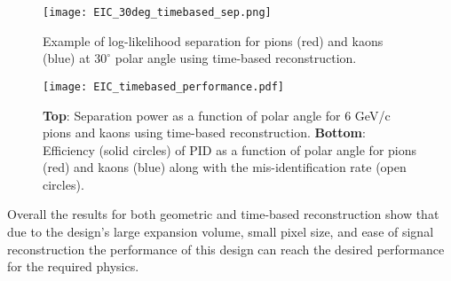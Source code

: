 \begin{figure}[!htb]
	\centering
	\texttt{[image: EIC\_30deg\_timebased\_sep.png]}
	\caption{Example of log-likelihood separation for pions (red) and kaons (blue) at $30^\circ$ polar angle using time-based reconstruction.}
	\label{fig:EIC_timebased_ex}
\end{figure}

\begin{figure}[!htb]
	\centering
	\texttt{[image: EIC\_timebased\_performance.pdf]}
	\caption{\textbf{Top}: Separation power as a function of polar angle for 6 GeV/c pions and kaons using time-based reconstruction. \textbf{Bottom}: Efficiency (solid circles) of PID as a function of polar angle for pions (red) and kaons (blue) along with the mis-identification rate (open circles).}
	\label{fig:EIC_timebased_performance}
\end{figure}

Overall the results for both geometric and time-based reconstruction show that due to the design's large expansion volume, small pixel size, and ease of signal reconstruction the performance of this design can reach the desired performance for the required physics.
